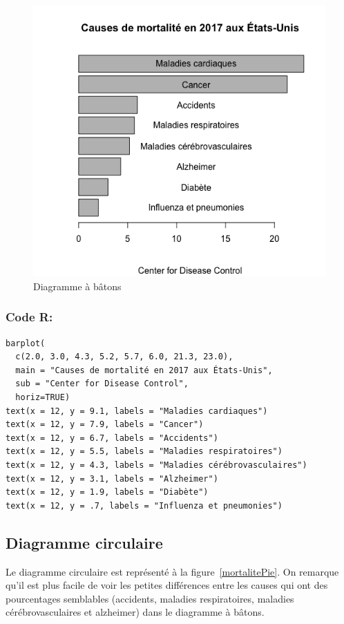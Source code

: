 \documentclass[10pt,twocolumn]{article}
\begin{document}
\begin{figure}[htbp]
	\caption{Diagramme à bâtons}
	\label{mortaliteBarplot}
	\centering
	\includegraphics[width=\linewidth]{d1_mortaliteBarplot}
\end{figure}

\subsubsection*{Code R:}
\begin{verbatim}
barplot(
  c(2.0, 3.0, 4.3, 5.2, 5.7, 6.0, 21.3, 23.0),
  main = "Causes de mortalité en 2017 aux États-Unis",
  sub = "Center for Disease Control",
  horiz=TRUE)
text(x = 12, y = 9.1, labels = "Maladies cardiaques")
text(x = 12, y = 7.9, labels = "Cancer")
text(x = 12, y = 6.7, labels = "Accidents")
text(x = 12, y = 5.5, labels = "Maladies respiratoires")
text(x = 12, y = 4.3, labels = "Maladies cérébrovasculaires")
text(x = 12, y = 3.1, labels = "Alzheimer")
text(x = 12, y = 1.9, labels = "Diabète")
text(x = 12, y = .7, labels = "Influenza et pneumonies")
\end{verbatim}


\subsection{Diagramme circulaire}
Le diagramme circulaire est représenté à la figure~\ref{mortalitePie}. On remarque qu’il est plus facile de voir les petites différences entre les causes qui ont des pourcentages semblables (accidents, maladies respiratoires, maladies cérébrovasculaires et alzheimer) dans le diagramme à bâtons.
\end{document}
